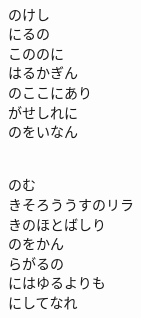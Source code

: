 \documentclass[10pt,b5j]{tarticle} %
\begin{document}
\vspace{1.5em} %
\newcommand{\linespace}{0.5em} %
\newcommand{\blocksize}{0.5\hsize} %
\newcommand{\itemmargin}{3em} %
\begin{enumerate} %
    \setlength{\itemindent}{\itemmargin} %
    \begin{minipage}[c]{\blocksize}
    
        \vspace{\linespace}
        \item~\\
        のけし\\
        にるの\\
        こののに\\
        はるかぎん\\
        のここにあり\\
        がせしれに\\
        のをいなん
        
    \end{minipage}
    \begin{minipage}[c]{\blocksize}
        
        \vspace{\linespace}
        \item~\\
        のむ\\
        きそろううすのリラ\\
        きのほとばしり\\
        のをかん\\
        らがるの\\
        にはゆるよりも\\
        にしてなれ
        
    \end{minipage}
    \begin{minipage}[c]{\blocksize}
        

\end{minipage}
\end{enumerate}
\end{document}
